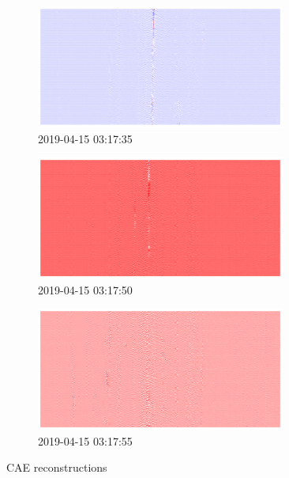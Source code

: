 \begin{figure}[p]
\centering
\begin{subfigure}{\textwidth}
    \centering
    \includegraphics[width=0.9\textwidth]{figures/anomalies/cae/20190415_031735.png}
    \caption{2019-04-15 03:17:35}
\end{subfigure}
\vspace{1em}
\begin{subfigure}{\textwidth}
    \centering
    \includegraphics[width=0.9\textwidth]{figures/anomalies/cae/20190415_031750.png}
    \caption{2019-04-15 03:17:50}
\end{subfigure}
\vspace{1em}
\begin{subfigure}{\textwidth}
    \centering
    \includegraphics[width=0.9\textwidth]{figures/anomalies/cae/20190415_031755.png}
    \caption{2019-04-15 03:17:55}
\end{subfigure}
\caption{CAE reconstructions}
\label{fig:cae_reconstructions}
\end{figure}
